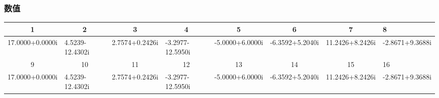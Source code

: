 \documentclass{../source/zjureport}
\begin{document}
            \subsubsection{数值}
                \begin{table}[]
                    \begin{tabular}{|l|l|l|l|l|l|l|l|}
                    \hline
                    \multicolumn{1}{|c|}{\textbf{1}}       & \multicolumn{1}{c|}{\textbf{2}}        & \multicolumn{1}{c|}{\textbf{3}}       & \multicolumn{1}{c|}{\textbf{4}}         & \multicolumn{1}{c|}{5}                 & \multicolumn{1}{c|}{6}                 & \multicolumn{1}{c|}{7}                 & 8                                      \\ \hline
                    17.0000+0.0000i                        & {\color[HTML]{000000} 4.5239-12.4302i} & {\color[HTML]{000000} 2.7574+0.2426i} & {\color[HTML]{000000} -3.2977-12.5950i} & {\color[HTML]{000000} -5.0000+6.0000i} & {\color[HTML]{000000} -6.3592+5.2040i} & {\color[HTML]{000000} 11.2426+8.2426i} & {\color[HTML]{000000} -2.8671+9.3688i} \\ \hline
                    \multicolumn{1}{|c|}{9}                & \multicolumn{1}{c|}{10}                & \multicolumn{1}{c|}{11}               & \multicolumn{1}{c|}{12}                 & \multicolumn{1}{c|}{13}                & \multicolumn{1}{c|}{14}                & \multicolumn{1}{c|}{15}                & 16                                     \\ \hline
                    {\color[HTML]{000000} 17.0000+0.0000i} & {\color[HTML]{000000} 4.5239-12.4302i} & {\color[HTML]{000000} 2.7574+0.2426i} & {\color[HTML]{000000} -3.2977-12.5950i} & {\color[HTML]{000000} -5.0000+6.0000i} & {\color[HTML]{000000} -6.3592+5.2040i} & {\color[HTML]{000000} 11.2426+8.2426i} & {\color[HTML]{000000} -2.8671+9.3688i} \\ \hline
                    \end{tabular}
                    \end{table}
\end{document}
